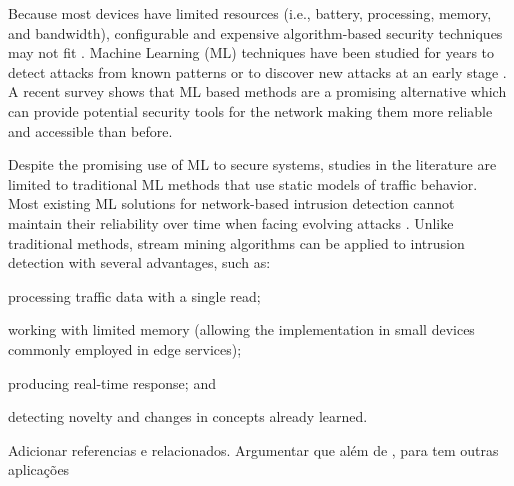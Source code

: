 Because most \iot devices have limited resources (i.e., battery, processing,
memory, and bandwidth), configurable and expensive algorithm-based
security techniques may not fit \cite{Zhou2017}.
Machine Learning (ML) techniques have been studied for years to detect attacks
from known patterns or to discover new attacks at an early stage
\cite{buczak2016survey,mitchell2014survey}.
A recent survey \cite{Tahsien2020} shows that ML based methods are a
promising alternative which can provide potential security tools for the \iot
network making them more reliable and accessible than before.

Despite the promising use of ML to secure \iot systems, studies in the
literature \cite{buczak2016survey,mitchell2014survey,Tahsien2020} are limited to
traditional ML methods that use static models of traffic behavior.
Most existing ML solutions for network-based intrusion detection cannot maintain
their reliability over time when facing evolving attacks \cite{Viegas2019}.
Unlike traditional methods, stream mining algorithms can be applied to intrusion
detection with several advantages, such as:
\begin{enumerate*}[label=(\emph{\roman*})]
    \item processing traffic data with a single read;
    \item working with limited memory (allowing the implementation in small
    devices commonly employed in edge services);
    \item producing real-time response; and
    \item detecting novelty and changes in concepts already learned.
\end{enumerate*}


{\color{red} Adicionar referencias e relacionados. Argumentar que além de \nids,
\nd para \iot tem outras aplicações}

